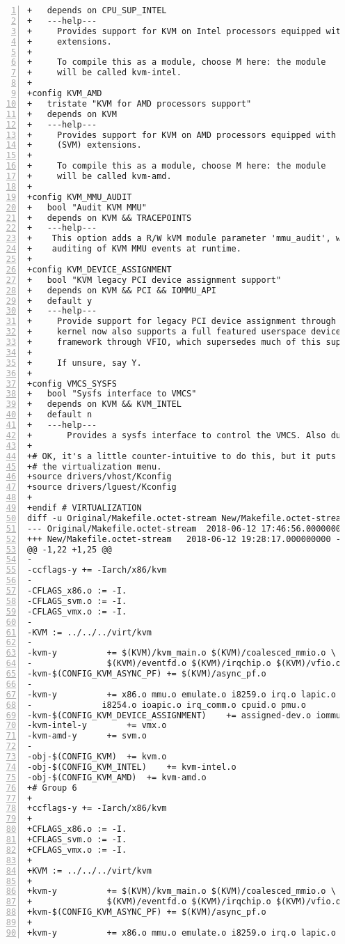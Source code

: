 \documentclass[10pt,draftclsnofoot,journal,compsoc,onecolumn]{IEEEtran}
\begin{document}
\begin{lstlisting}[numbers=left]
+	depends on CPU_SUP_INTEL
+	---help---
+	  Provides support for KVM on Intel processors equipped with the VT
+	  extensions.
+
+	  To compile this as a module, choose M here: the module
+	  will be called kvm-intel.
+
+config KVM_AMD
+	tristate "KVM for AMD processors support"
+	depends on KVM
+	---help---
+	  Provides support for KVM on AMD processors equipped with the AMD-V
+	  (SVM) extensions.
+
+	  To compile this as a module, choose M here: the module
+	  will be called kvm-amd.
+
+config KVM_MMU_AUDIT
+	bool "Audit KVM MMU"
+	depends on KVM && TRACEPOINTS
+	---help---
+	 This option adds a R/W kVM module parameter 'mmu_audit', which allows
+	 auditing of KVM MMU events at runtime.
+
+config KVM_DEVICE_ASSIGNMENT
+	bool "KVM legacy PCI device assignment support"
+	depends on KVM && PCI && IOMMU_API
+	default y
+	---help---
+	  Provide support for legacy PCI device assignment through KVM.  The
+	  kernel now also supports a full featured userspace device driver
+	  framework through VFIO, which supersedes much of this support.
+
+	  If unsure, say Y.
+
+config VMCS_SYSFS
+	bool "Sysfs interface to VMCS"
+	depends on KVM && KVM_INTEL
+	default n
+	---help---
+		Provides a sysfs interface to control the VMCS. Also dumps the contents of the VMCS.
+
+# OK, it's a little counter-intuitive to do this, but it puts it neatly under
+# the virtualization menu.
+source drivers/vhost/Kconfig
+source drivers/lguest/Kconfig
+
+endif # VIRTUALIZATION
diff -u Original/Makefile.octet-stream New/Makefile.octet-stream
--- Original/Makefile.octet-stream	2018-06-12 17:46:56.000000000 -0700
+++ New/Makefile.octet-stream	2018-06-12 19:28:17.000000000 -0700
@@ -1,22 +1,25 @@
-
-ccflags-y += -Iarch/x86/kvm
-
-CFLAGS_x86.o := -I.
-CFLAGS_svm.o := -I.
-CFLAGS_vmx.o := -I.
-
-KVM := ../../../virt/kvm
-
-kvm-y			+= $(KVM)/kvm_main.o $(KVM)/coalesced_mmio.o \
-				$(KVM)/eventfd.o $(KVM)/irqchip.o $(KVM)/vfio.o
-kvm-$(CONFIG_KVM_ASYNC_PF)	+= $(KVM)/async_pf.o
-
-kvm-y			+= x86.o mmu.o emulate.o i8259.o irq.o lapic.o \
-			   i8254.o ioapic.o irq_comm.o cpuid.o pmu.o
-kvm-$(CONFIG_KVM_DEVICE_ASSIGNMENT)	+= assigned-dev.o iommu.o
-kvm-intel-y		+= vmx.o
-kvm-amd-y		+= svm.o
-
-obj-$(CONFIG_KVM)	+= kvm.o
-obj-$(CONFIG_KVM_INTEL)	+= kvm-intel.o
-obj-$(CONFIG_KVM_AMD)	+= kvm-amd.o
+# Group 6
+
+ccflags-y += -Iarch/x86/kvm
+
+CFLAGS_x86.o := -I.
+CFLAGS_svm.o := -I.
+CFLAGS_vmx.o := -I.
+
+KVM := ../../../virt/kvm
+
+kvm-y			+= $(KVM)/kvm_main.o $(KVM)/coalesced_mmio.o \
+				$(KVM)/eventfd.o $(KVM)/irqchip.o $(KVM)/vfio.o
+kvm-$(CONFIG_KVM_ASYNC_PF)	+= $(KVM)/async_pf.o
+
+kvm-y			+= x86.o mmu.o emulate.o i8259.o irq.o lapic.o \

\end{lstlisting}
\end{document}
